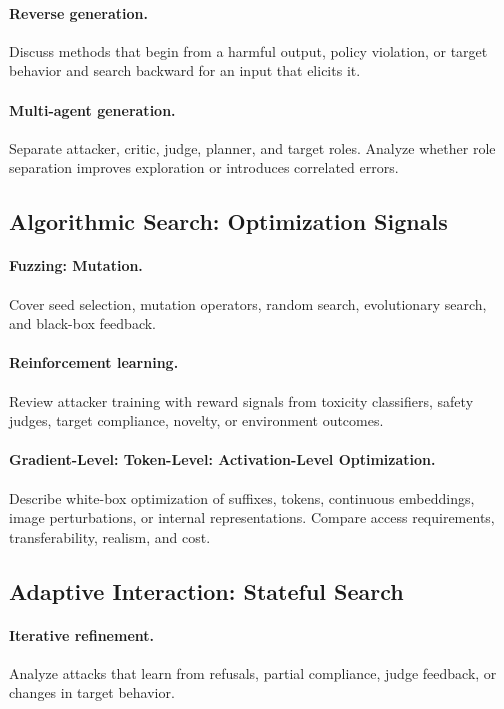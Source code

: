 \documentclass[review]{fcs}
\begin{document}
\paragraph{Reverse generation.}
Discuss methods that begin from a harmful output, policy violation, or target behavior and search backward for an input that elicits it.

\paragraph{Multi-agent generation.}
Separate attacker, critic, judge, planner, and target roles. Analyze whether role separation improves exploration or introduces correlated errors.

\subsection{Algorithmic Search: Optimization Signals}

\paragraph{Fuzzing: Mutation.}
Cover seed selection, mutation operators, random search, evolutionary search, and black-box feedback.

\paragraph{Reinforcement learning.}
Review attacker training with reward signals from toxicity classifiers, safety judges, target compliance, novelty, or environment outcomes.

\paragraph{Gradient-Level: Token-Level: Activation-Level Optimization.}
Describe white-box optimization of suffixes, tokens, continuous embeddings, image perturbations, or internal representations. Compare access requirements, transferability, realism, and cost.

\subsection{Adaptive Interaction: Stateful Search}

\paragraph{Iterative refinement.}
Analyze attacks that learn from refusals, partial compliance, judge feedback, or changes in target behavior.
\end{document}
